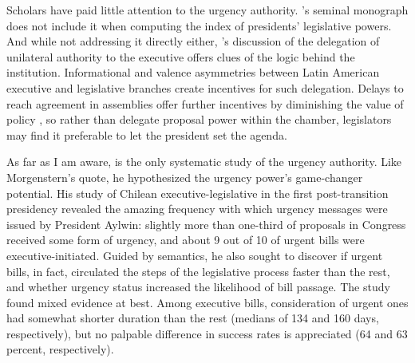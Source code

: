 \documentclass[letter,12pt]{article}
\begin{document}
\noindent Scholars have paid little attention to the urgency authority. \citeauthor{shugart.carey.1992}'s \citeyearpar{shugart.carey.1992} seminal monograph does not include it when computing the index of presidents' legislative powers. And while not addressing it directly either, \citeauthor{carey.shugart.1998a}'s \citeyearpar{carey.shugart.1998a} discussion of the delegation of unilateral authority to the executive offers clues of the logic behind the institution. Informational and valence asymmetries between Latin American executive and legislative branches create incentives for such delegation. Delays to reach agreement in assemblies offer further incentives by diminishing the value of policy \citep{baron.ferejohn.1989}, so rather than delegate proposal power within the chamber, legislators may find it preferable to let the president set the agenda. 


As far as I am aware, \citet{siavelis.2002} is the only systematic study of the urgency authority. Like Morgenstern's quote, he hypothesized the urgency power's game-changer potential. His study of Chilean executive-legislative in the first post-transition presidency revealed the amazing frequency with which urgency messages were issued by President Aylwin: slightly more than one-third of proposals in Congress received some form of urgency, and about 9 out of 10 of urgent bills were executive-initiated. Guided by semantics, he also sought to discover if urgent bills, in fact, circulated the steps of the legislative process faster than the rest, and whether urgency status increased the likelihood of bill passage. The study found mixed evidence at best. Among executive bills, consideration of urgent ones had somewhat shorter duration than the rest (medians of 134 and 160 days, respectively), but no palpable difference in success rates is appreciated (64 and 63 percent, respectively). 
\end{document}
